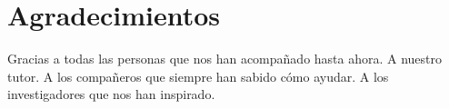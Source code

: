 
\chapter*{Agradecimientos}

Gracias a todas las personas que nos han acompañado hasta ahora. A nuestro tutor. A los compañeros que siempre han sabido cómo ayudar. A los investigadores que nos han inspirado.